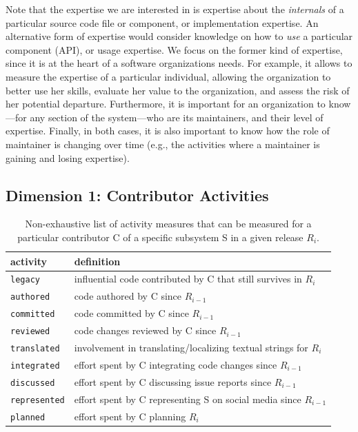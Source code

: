 Note that the expertise we are interested in is expertise about the {\em internals} of a particular source code file or component, or implementation expertise. An alternative form of expertise would consider knowledge on how to {\em use} a particular component (API), or usage expertise. We focus on the former kind of expertise, since it is at the heart of a software organizations needs. For example, it allows to measure the expertise of a particular individual, allowing the organization to better use her skills, evaluate her value to the
organization, and assess the risk of her potential departure. Furthermore, it is important for an organization to know---for any
section of the system---who are its maintainers, and their level of expertise. Finally, in both cases, it is also
important to know how the role of maintainer is changing over time (e.g., the activities where a maintainer is gaining and losing
expertise).






\subsection{Dimension 1: Contributor Activities}
\label{sec:contribution-metrics}

\begin{table}[t]
\caption{Non-exhaustive list of activity measures that can be measured for a particular contributor C of a specific subsystem S in a given release $R_i$.}
\label{tab:met}
\begin{center}
\begin{tabular}{ll}
activity & definition\\
\hline
\texttt{legacy} & influential code contributed by C that still survives in $R_i$\\
\texttt{authored} & code authored by C since $R_{i-1}$\\
\texttt{committed} & code committed by C since $R_{i-1}$\\
  \texttt{reviewed} & code changes reviewed by C since $R_{i-1}$\\
    \texttt{translated} & involvement in translating/localizing textual strings for $R_{i}$\\
  \texttt{integrated} & effort spent by C integrating code changes since $R_{i-1}$\\
  \texttt{discussed} & effort spent by C discussing issue reports since $R_{i-1}$\\
  \texttt{represented} & effort spent by C representing S on social media since $R_{i-1}$\\
      \texttt{planned} & effort spent by C planning $R_{i}$\\
\end{tabular}
\end{center}

\end{table}

